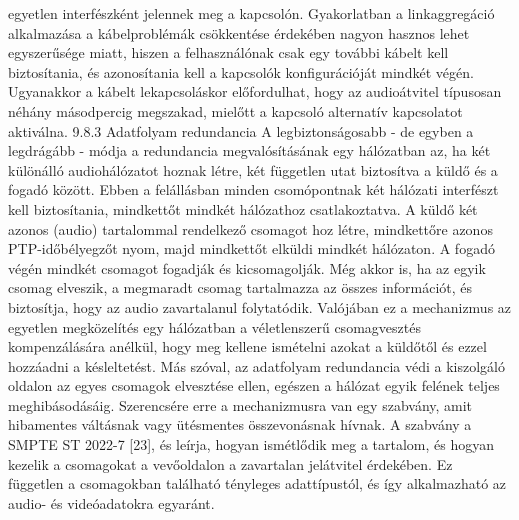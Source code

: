 egyetlen interfészként jelennek meg a kapcsolón. Gyakorlatban a linkaggregáció
alkalmazása a kábelproblémák csökkentése érdekében nagyon hasznos lehet
egyszerűsége miatt, hiszen a felhasználónak csak egy további kábelt kell
biztosítania, és azonosítania kell a kapcsolók konfigurációját mindkét végén.
Ugyanakkor a kábelt lekapcsoláskor előfordulhat, hogy az audioátvitel típusosan
néhány másodpercig megszakad, mielőtt a kapcsoló alternatív kapcsolatot
aktiválna. 9.8.3 Adatfolyam redundancia A legbiztonságosabb - de egyben a
legdrágább - módja a redundancia megvalósításának egy hálózatban az, ha két
különálló audiohálózatot hoznak létre, két független utat biztosítva a küldő és
a fogadó között. Ebben a felállásban minden csomópontnak két hálózati interfészt
kell biztosítania, mindkettőt mindkét hálózathoz csatlakoztatva. A küldő két
azonos (audio) tartalommal rendelkező csomagot hoz létre, mindkettőre azonos
PTP-időbélyegzőt nyom, majd mindkettőt elküldi mindkét hálózaton. A fogadó végén
mindkét csomagot fogadják és kicsomagolják. Még akkor is, ha az egyik csomag
elveszik, a megmaradt csomag tartalmazza az összes információt, és biztosítja,
hogy az audio zavartalanul folytatódik. Valójában ez a mechanizmus az egyetlen
megközelítés egy hálózatban a véletlenszerű csomagvesztés kompenzálására anélkül,
hogy meg kellene ismételni azokat a küldőtől és ezzel hozzáadni a késleltetést.
Más szóval, az adatfolyam redundancia védi a kiszolgáló oldalon az egyes
csomagok elvesztése ellen, egészen a hálózat egyik felének teljes
meghibásodásáig. Szerencsére erre a mechanizmusra van egy szabvány, amit
hibamentes váltásnak vagy ütésmentes összevonásnak hívnak. A szabvány a SMPTE ST
2022-7 [23], és leírja, hogyan ismétlődik meg a tartalom, és hogyan kezelik a
csomagokat a vevőoldalon a zavartalan jelátvitel érdekében. Ez független a
csomagokban található tényleges adattípustól, és így alkalmazható az audio- és
videóadatokra egyaránt.




